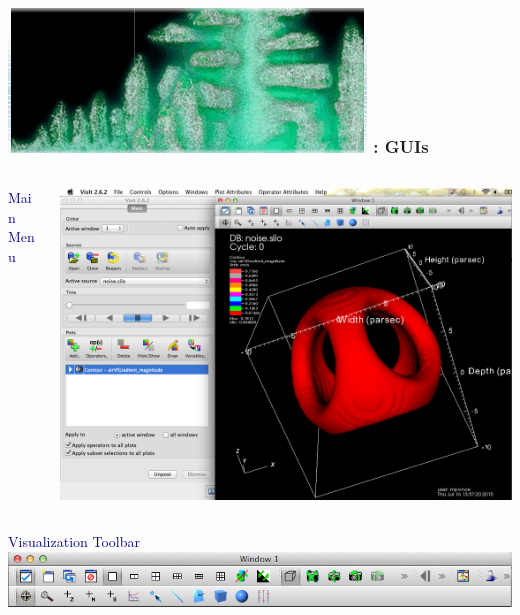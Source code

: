 \begin{frame}
\frametitle{\href{https://wci.llnl.gov/simulation/computer-codes/visit/}{\includegraphics[height=.85cm]{figs/visit-logos/VisIt-04}} \hspace{-.85cm}{\bf \textcolor{white}{VisIt}}: GUIs}

\vspace{-3mm}
\begin{columns}
\begin{column}{5cm}
\begin{beamerboxesrounded}[upper=block head,lower=block body,shadow=true]{  \textcolor{DarkBlue}{Main Menu} }

        \textcolor{DarkBlue}{} 

        \textcolor{DarkBlue}{} 

        \textcolor{DarkBlue}{} 

        \textcolor{DarkBlue}{} 

        \textcolor{DarkBlue}{} 

        \textcolor{DarkBlue}{} 

        \textcolor{DarkBlue}{} 
\end{beamerboxesrounded}
\end{column}
\begin{column}{6cm}
        \centering
        \includegraphics[clip=true,trim=0 0 17cm 0, width=.85\columnwidth]{figs/visit-guis/VisIt_windows}
\end{column}
\end{columns}

\begin{beamerboxesrounded}[upper=block head,lower=block body,shadow=true]{  \textcolor{DarkBlue}{Visualization Toolbar} }
        \centering
        \includegraphics[width=.85\columnwidth]{figs/visit-guis/VisIt_toolbar}
\end{beamerboxesrounded}
\end{frame}



